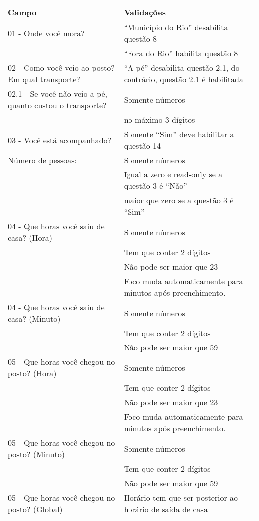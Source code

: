 \begin{longtable}{p{}|p{}}

Campo & Validações \\ \hline

01 - Onde você mora? & ``Município do Rio'' desabilita questão 8  \\ \cline{2-2}  & ``Fora do Rio'' habilita questão 8 \\ \hline

02 - Como você veio ao posto? Em qual transporte?  & ``A pé'' desabilita questão 2.1, do contrário, questão 2.1 é habilitada \\ \hline

02.1 - Se você não veio a pé, quanto custou o transporte? & Somente números \\ \cline{2-2} & no máximo 3 dígitos \\ \hline

03 - Você está acompanhado? & Somente ``Sim'' deve habilitar a questão 14 \\ \hline
Número de pessoas: & Somente números \\ \cline{2-2} & Igual a zero e read-only se a questão 3 é ``Não'' \\ \cline{2-2} & maior que zero se a questão 3 é ``Sim'' \\ \hline

04 - Que horas você saiu de casa? (Hora) & Somente números \\ \cline{2-2}  & Tem que conter 2 dígitos \\ \cline{2-2} & Não pode ser maior que 23 \\ \cline{2-2} & Foco muda automaticamente para minutos após preenchimento.  \\ \hline
04 - Que horas você saiu de casa? (Minuto) & Somente números \\ \cline{2-2}  & Tem que conter 2 dígitos \\ \cline{2-2} & Não pode ser maior que 59 \\ \hline

05 - Que horas você chegou no posto? (Hora) & Somente números \\ \cline{2-2}  & Tem que conter 2 dígitos \\ \cline{2-2} & Não pode ser maior que 23 \\ \cline{2-2} & Foco muda automaticamente para minutos após preenchimento.  \\ \hline
05 - Que horas você chegou no posto? (Minuto) & Somente números \\ \cline{2-2}  & Tem que conter 2 dígitos \\ \cline{2-2} & Não pode ser maior que 59 \\ \hline
05 - Que horas você chegou no posto? (Global) & Horário tem que ser posterior ao horário de saída de casa \\ \hline 


\end{longtable}
